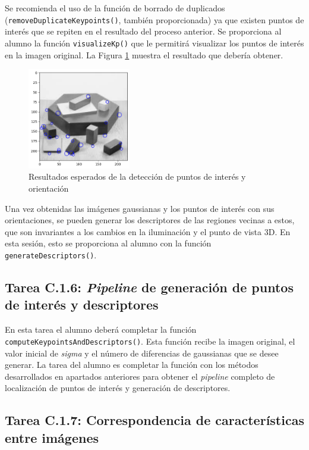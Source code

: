 Se recomienda el uso de la función de borrado de duplicados (\texttt{removeDuplicateKeypoints()}, también proporcionada) ya que existen puntos de interés que se repiten en el resultado del proceso anterior. Se proporciona al alumno la función \texttt{visualizeKp()} que le permitirá visualizar los puntos de interés en la imagen original. La Figura \ref{fig:KPDet} muestra el resultado que debería obtener.

\begin{figure}[h]
    \centering
    \includegraphics[width=0.4\textwidth]{Lab_3/template/figures/KeypointDetect.png}
    \caption{Resultados esperados de la detección de puntos de interés y orientación}
    \label{fig:KPDet}
\end{figure}

Una vez obtenidas las imágenes gaussianas y los puntos de interés con sus orientaciones, se pueden generar los descriptores de las regiones vecinas a estos, que son invariantes a los cambios en la iluminación y el punto de vista 3D. En esta sesión, esto se proporciona al alumno con la función \texttt{generateDescriptors()}.

\subsection*{Tarea C.1.6: \textit{Pipeline} de generación de puntos de interés y descriptores}

En esta tarea el alumno deberá completar la función \texttt{computeKeypointsAndDescriptors()}. Esta función recibe la imagen original, el valor inicial de \textit{sigma} y el número de diferencias de gaussianas que se desee generar. La tarea del alumno es completar la función con los métodos desarrollados en apartados anteriores para obtener el \textit{pipeline} completo de localización de puntos de interés y generación de descriptores.

\subsection*{Tarea C.1.7: Correspondencia de características entre imágenes}

